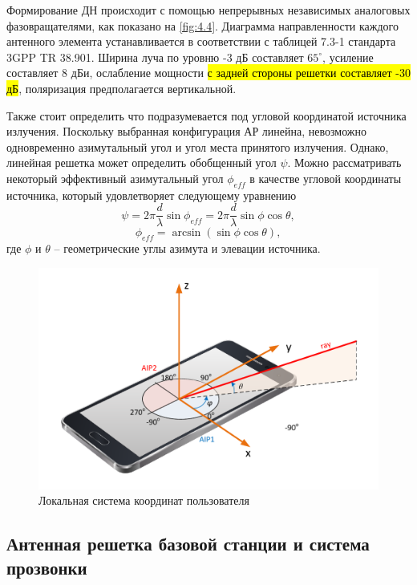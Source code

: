 Формирование ДН происходит с помощью непрерывных независимых аналоговых фазовращателями, как показано
на \ref{fig:4.4}.  Диаграмма направленности каждого антенного элемента устанавливается в
соответствии с таблицей 7.3-1 стандарта 3GPP TR 38.901. Ширина луча по уровню -3
дБ составляет $65^\circ$, усиление составляет 8 дБи, ослабление мощности \hl{с задней стороны решетки составляет
-30 дБ}, поляризация предполагается вертикальной.





Также стоит определить что подразумевается под угловой координатой источника
излучения.  Поскольку выбранная конфигурация АР линейна, невозможно одновременно
азимутальный угол и угол места принятого излучения.  Однако, линейная решетка
может определить обобщенный угол $\psi$. Можно рассматривать некоторый
эффективный азимутальный угол $\phi_{eff}$ в качестве угловой координаты
источника, который удовлетворяет следующему уравнению
\begin{equation}
    \label{eq:4.1}
    \psi = 2\pi \frac{d}{\lambda} \sin \phi_{eff} = 2\pi \frac{d}{\lambda} \sin\phi \cos{\theta},
\end{equation}
\begin{equation}
    \label{eq:4.2}
    \phi_{eff} = \arcsin(\sin \phi \cos \theta),
\end{equation}
где $\phi$ и $\theta$ -- геометрические углы азимута и элевации источника.

\begin{figure}[ht]
    \centering
    \includegraphics[width=0.75\linewidth]{figs/fig4.5}
    \caption{Локальная система координат пользователя}
    \label{fig:4.5}
\end{figure}

\subsection{Антенная решетка базовой станции и система прозвонки}

